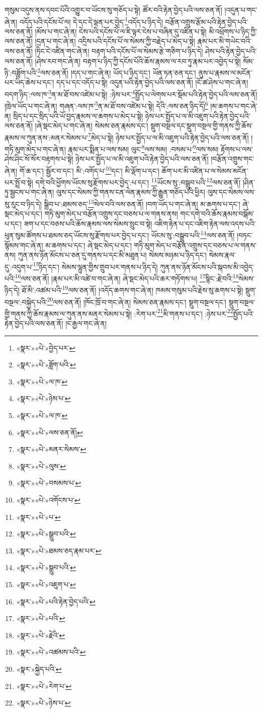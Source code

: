 གསུམ་འདུས་ནས་དབང་པོའི་འགྱུར་བ་ཡོངས་སུ་གཅོད་པ་སྟེ། ཚོར་བའི་རྟེན་བྱེད་པའི་ལས་ཅན་ནོ། །འདུན་པ་གང་ཞེ་ན། འདོད་པའི་དངོས་པོ་ལ། དེ་དང་དེ་ལྡན་པར་བྱེད་\footnote{«སྣར་»«པེ་»བྱེད་པར་}འདོད་པ་ཉིད་དེ། བརྩོན་འགྲུས་རྩོམ་པའི་རྟེན་བྱེད་པའི་ལས་ཅན་ནོ། །མོས་པ་གང་ཞེ་ན། ངེས་པའི་དངོས་པོ་ལ་ཇི་ལྟར་ངེས་པ་བཞིན་དུ་འཛིན་པ་སྟེ། མི་འཕྲོགས་པ་ཉིད་ཀྱི་ལས་ཅན་ནོ། །དྲན་པ་གང་ཞེ་ན། འདྲིས་པའི་དངོས་པོ་ལ་སེམས་ཀྱི་བརྗེད་པ་མེད་པ་སྟེ། རྣམ་པར་མི་གཡེང་བའི་ལས་ཅན་ནོ། །ཏིང་ངེ་འཛིན་གང་ཞེ་ན། བརྟག་པའི་དངོས་པོ་ལ་སེམས་རྩེ་གཅིག་པ་ཉིད་དེ། ཤེས་པའི་རྟེན་བྱེད་པའི་ལས་ཅན་ནོ། །ཤེས་རབ་གང་ཞེ་ན། བརྟག་པ་ཉིད་ཀྱི་དངོས་པོའི་ཆོས་རྣམས་ལ་རབ་ཏུ་རྣམ་པར་འབྱེད་པ་སྟེ། སོམ་ཉི་:བཟློག་པའི་\footnote{«སྣར་»«པེ་»ཟློག་པའི་}ལས་ཅན་ནོ། །དད་པ་གང་ཞེ་ན། ཡོད་པ་ཉིད་དང་། ཡོན་ཏན་ཅན་དང་། ནུས་པ་རྣམས་ལ་མངོན་པར་ཡིད་ཆེས་པ་དང་། དད་པ་དང་འདོད་པ་སྟེ། འདུན་པའི་རྟེན་བྱེད་པའི་ལས་ཅན་ནོ། །ངོ་ཚ་ཤེས་པ་གང་ཞེ་ན། བདག་ཉིད་:ལས་ཁ་\footnote{«སྣར་»«པེ་»ལ་ཁ་}ན་མ་ཐོ་བས་འཛེམ་པ་སྟེ། :ཉེས་པར་\footnote{«སྣར་»«པེ་»ཉེས་པ་}སྤྱོད་པ་ལེགས་པར་སྡོམ་པའི་རྟེན་བྱེད་པའི་ལས་ཅན་ནོ། །ཁྲེལ་ཡོད་པ་གང་ཞེ་ན། གཞན་:ལས་ཁ་\footnote{«སྣར་»«པེ་»ལ་ཁ་}ན་མ་ཐོ་བས་འཛེམ་པ་སྟེ། དེའི་:ལས་ཅན་ཉིད་དོ།\footnote{«སྣར་»«པེ་»ལས་ཅན་ནོ།} །མ་ཆགས་པ་གང་ཞེ་ན། སྲིད་པ་དང་སྲིད་པའི་ཡོ་བྱད་རྣམས་ལ་ཆགས་པ་མེད་པ་སྟེ། ཉེས་པར་སྤྱོད་པ་ལ་མི་འཇུག་པའི་རྟེན་བྱེད་པའི་ལས་ཅན་ནོ། །ཞེ་སྡང་མེད་པ་གང་ཞེ་ན། སེམས་ཅན་རྣམས་དང་། སྡུག་བསྔལ་དང་སྡུག་བསྔལ་གྱི་གནས་ཀྱི་ཆོས་རྣམས་ལ་ཀུན་ནས་:མནར་སེམས་པ་\footnote{«སྣར་»«པེ་»མནར་སེམས་}མེད་པ་སྟེ། ཉེས་པར་སྤྱོད་པ་ལ་མི་འཇུག་པའི་རྟེན་བྱེད་པའི་ལས་ཅན་ནོ། །གཏི་མུག་མེད་པ་གང་ཞེ་ན། རྣམ་པར་སྨིན་པ་ལས་སམ། ལུང་\footnote{«སྣར་»«པེ་»ལུས་}ལས་སམ། :བསམ་པ་\footnote{«སྣར་»«པེ་»བསམས་པ་}ལས་སམ། རྟོགས་པ་ལས་ཤེས་ཤིང་སོ་སོར་བརྟགས་པ་སྟེ། ཉེས་པར་སྤྱོད་པ་ལ་མི་འཇུག་པའི་རྟེན་བྱེད་པའི་ལས་ཅན་ནོ། །བརྩོན་འགྲུས་གང་ཞེ་ན། གོ་ཆ་དང་། སྦྱོར་བ་དང་། མི་:འགོད་པ་\footnote{«སྣར་»«པེ་»འགོངས་པ་}དང་། མི་ལྡོག་པ་དང་། ཆོག་པར་མི་འཛིན་པ་ལ་སེམས་མངོན་པར་སྤྲོ་བ་སྟེ། དགེ་བའི་ཕྱོགས་ཡོངས་སུ་རྫོགས་པར་བྱེད་:པ་དང་། \footnote{«སྣར་»«པེ་»པ་}ཡོངས་སུ་:བསྒྲུབ་པའི་\footnote{«སྣར་»«པེ་»སྒྲུབ་པའི་}ལས་ཅན་ནོ། །ཤིན་ཏུ་སྦྱངས་པ་གང་ཞེ་ན། ལུས་དང་སེམས་ཀྱི་གནས་ངན་ལེན་རྣམས་ཀྱི་རྒྱུན་གཅོད་པའི་ཕྱིར། ལུས་དང་སེམས་ལས་སུ་རུང་བ་ཉིད་དེ། སྒྲིབ་པ་:ཐམས་ཅད་\footnote{«སྣར་»«པེ་»ཐམས་ཅད་རྣམ་པར་}སེལ་བའི་ལས་ཅན་ནོ། །བག་ཡོད་པ་གང་ཞེ་ན། མ་ཆགས་པ་དང་། ཞེ་སྡང་མེད་པ་དང་། གཏི་མུག་མེད་པ་བརྩོན་འགྲུས་དང་བཅས་པ་ལ་གནས་ནས། གང་དགེ་བའི་ཆོས་རྣམས་བསྒོམ་པ་དང་། ཟག་པ་དང་བཅས་པའི་ཆོས་རྣམས་ལས་སེམས་སྲུང་བ་སྟེ། འཇིག་རྟེན་པ་དང་འཇིག་རྟེན་ལས་འདས་པའི་ཕུན་སུམ་ཚོགས་པ་ཐམས་ཅད་ཡོངས་སུ་རྫོགས་པར་བྱེད་པ་དང་། ཡོངས་སུ་:བསྒྲུབ་པའི་\footnote{«སྣར་»«པེ་»སྒྲུབ་པའི་}ལས་ཅན་ནོ། །བཏང་སྙོམས་གང་ཞེ་ན། མ་ཆགས་པ་དང་། ཞེ་སྡང་མེད་པ་དང་། གཏི་མུག་མེད་པ་བརྩོན་འགྲུས་དང་བཅས་པ་ལ་གནས་ནས། ཀུན་ནས་ཉོན་མོངས་པ་ཅན་དུ་གནས་པ་དང་མི་མཐུན་པ། སེམས་མཉམ་པ་ཉིད་དང་། སེམས་རྣལ་དུ་:འདུག་པ་\footnote{«སྣར་»«པེ་»འཇུག་པ་}ཉིད་དང་། སེམས་ལྷུན་གྱིས་གྲུབ་པར་གནས་པ་ཉིད་དེ། ཀུན་ནས་ཉོན་མོངས་པའི་སྐབས་མི་འབྱེད་པའི་\footnote{«སྣར་»«པེ་»པའི་རྟེན་བྱེད་པའི་}ལས་ཅན་ནོ། །རྣམ་པར་མི་འཚེ་བ་གང་ཞེ་ན། ཞེ་སྡང་མེད་པའི་ཆར་གཏོགས་པ། \footnote{«སྣར་»«པེ་»པའི་}སྙིང་:རྗེ་བའི་\footnote{«སྣར་»«པེ་»རྗེའི་}སེམས་ཉིད་དེ། ཐོ་མི་:འཚམ་པའི་\footnote{«སྣར་»«པེ་»འཚམས་པའི་}ལས་ཅན་ནོ། །འདོད་ཆགས་གང་ཞེ་ན། ཁམས་གསུམ་པའི་རྗེས་སུ་ཆགས་པ་སྟེ། སྡུག་བསྔལ་:བསྐྱེད་པའི་\footnote{«སྣར་»སྐྱེད་པའི་}ལས་ཅན་ནོ། །ཁོང་ཁྲོ་བ་གང་ཞེ་ན། སེམས་ཅན་རྣམས་དང་། སྡུག་བསྔལ་དང་། སྡུག་བསྔལ་གྱི་གནས་ཀྱི་ཆོས་རྣམས་ལ་ཀུན་ནས་མནར་སེམས་པ་སྟེ། :རེག་པར་\footnote{«སྣར་»«པེ་»རེག་པ་}མི་གནས་པ་དང་། :ཉེས་པར་\footnote{«སྣར་»«པེ་»ཉེས་པ་}སྤྱོད་པའི་རྟེན་བྱེད་པའི་ལས་ཅན་ནོ། །ང་རྒྱལ་གང་ཞེ་ན། 